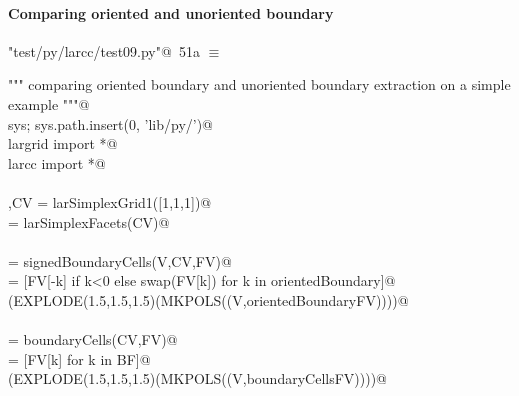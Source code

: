 \documentclass[11pt,oneside]{article}    %
\begin{document}
\paragraph{Comparing oriented and unoriented boundary}

\begin{flushleft} \small \label{scrap83}
\protect{}\verb@"test/py/larcc/test09.py"@\nobreak\ {\footnotesize 51a }$\equiv$
\vspace{-1ex}
\begin{list}{}{} \item
\mbox{}\verb@""" comparing oriented boundary and unoriented boundary extraction on a simple example """@\\
\mbox{}\verb@import sys; sys.path.insert(0, 'lib/py/')@\\
\mbox{}\verb@from largrid import *@\\
\mbox{}\verb@from larcc import *@\\
\mbox{}\verb@@\\
\mbox{}\verb@V,CV = larSimplexGrid1([1,1,1])@\\
\mbox{}\verb@FV = larSimplexFacets(CV)@\\
\mbox{}\verb@@\\
\mbox{}\verb@orientedBoundary = signedBoundaryCells(V,CV,FV)@\\
\mbox{}\verb@orientedBoundaryFV = [FV[-k] if k<0 else swap(FV[k]) for k in orientedBoundary]@\\
\mbox{}\verb@VIEW(EXPLODE(1.5,1.5,1.5)(MKPOLS((V,orientedBoundaryFV))))@\\
\mbox{}\verb@@\\
\mbox{}\verb@BF = boundaryCells(CV,FV)@\\
\mbox{}\verb@boundaryCellsFV = [FV[k] for k in BF]@\\
\mbox{}\verb@VIEW(EXPLODE(1.5,1.5,1.5)(MKPOLS((V,boundaryCellsFV))))@\\
\mbox{}\verb@@{\NWsep}
\end{list}
\vspace{-2ex}
\end{flushleft}
\end{document}
